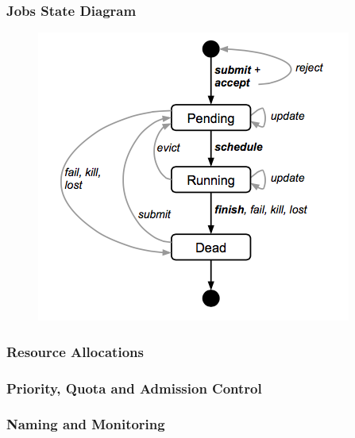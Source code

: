\begin{frame}
\frametitle{Jobs State Diagram}
\begin{figure}[h]
  \centering
  \includegraphics[scale=0.5]{./figures/borg_state_diagram}
  \label{fig:borg_state_diagram}
\end{figure}
\end{frame}

\begin{frame}
\frametitle{Resource Allocations}
\end{frame}

\begin{frame}
\frametitle{Priority, Quota and Admission Control}
\end{frame}

\begin{frame}
\frametitle{Naming and Monitoring}
\end{frame}
